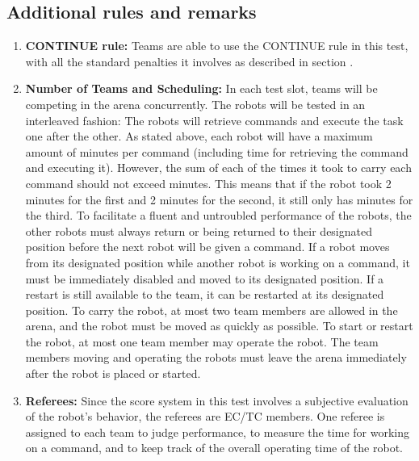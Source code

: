 \subsection{Additional rules and remarks}
\label{sec:eegpsr-remarks}
\begin{enumerate}
	\item \textbf{CONTINUE rule:} Teams are able to use the CONTINUE rule in this test, with all the standard penalties it involves as described in section .

	\item \textbf{Number of Teams and Scheduling:} In each test slot, \eegpsrTeams teams will be competing in the arena concurrently. The robots will be tested in an interleaved fashion: The robots will retrieve commands and execute the task one after the other. As stated above, each robot will have a maximum amount of \eegpsrMaxCmdTime minutes per command (including time for retrieving the command and executing it). However, the sum of each of the times it took to carry each command should not exceed \eegpsrMaxTeamTime minutes. This means that if the robot took
	2 minutes for the first and 2 minutes for the second, it still only has \eegpsrMaxCmdTime minutes for the third. To facilitate a fluent and untroubled performance of the robots, the other robots must always return or being returned to their designated position before the next robot will be given a command. If a robot moves from its designated position while another robot is working on a command, it must be immediately disabled and moved to its designated position. If a restart is still available to the team, it can be restarted at its designated position. To carry the robot, at most two team members are allowed in the arena, and the robot must be moved as quickly as possible. To start or restart the robot, at most one team member may operate the robot. The team members moving and operating the robots must leave the arena immediately after the robot is placed or started. \\

	\item \textbf{Referees:} Since the score system in this test involves a subjective evaluation of the robot's behavior, the referees are EC/TC members. One referee is assigned to each team to judge performance, to measure the time for working on a command, and to keep track of the overall operating time of the robot. \\


\end{enumerate}
